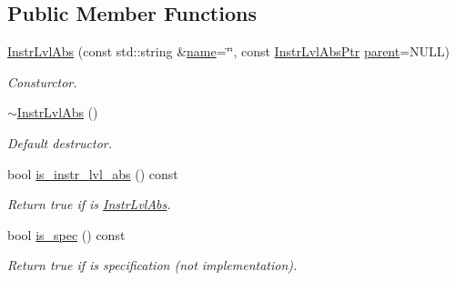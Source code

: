 \subsection*{Public Member Functions}
\begin{DoxyCompactItemize}
\item 
\mbox{\label{classilang_1_1_instr_lvl_abs_aac125331f365cf6e347269051e328100}} 
\mbox{\hyperlink{classilang_1_1_instr_lvl_abs_aac125331f365cf6e347269051e328100}{Instr\+Lvl\+Abs}} (const std\+::string \&\mbox{\hyperlink{classilang_1_1_object_acf20b072e69f572910d7d80c93af0b38}{name}}=\char`\"{}\char`\"{}, const \mbox{\hyperlink{classilang_1_1_instr_lvl_abs_a743fd98e5ad145d70cb0dabf8db0007c}{Instr\+Lvl\+Abs\+Ptr}} \mbox{\hyperlink{classilang_1_1_instr_lvl_abs_ab529f7a931940d7f870cc83fd214822f}{parent}}=N\+U\+LL)
\begin{DoxyCompactList}\small\item\em Consturctor. \end{DoxyCompactList}\item 
\mbox{\label{classilang_1_1_instr_lvl_abs_a9e740acc6e2c56ea7b0fe09fc74b5107}} 
\mbox{\hyperlink{classilang_1_1_instr_lvl_abs_a9e740acc6e2c56ea7b0fe09fc74b5107}{$\sim$\+Instr\+Lvl\+Abs}} ()
\begin{DoxyCompactList}\small\item\em Default destructor. \end{DoxyCompactList}\item 
\mbox{\label{classilang_1_1_instr_lvl_abs_afc9eae178b638c21f36162408f9d0553}} 
bool \mbox{\hyperlink{classilang_1_1_instr_lvl_abs_afc9eae178b638c21f36162408f9d0553}{is\+\_\+instr\+\_\+lvl\+\_\+abs}} () const
\begin{DoxyCompactList}\small\item\em Return true if is \mbox{\hyperlink{classilang_1_1_instr_lvl_abs}{Instr\+Lvl\+Abs}}. \end{DoxyCompactList}\item 
\mbox{\label{classilang_1_1_instr_lvl_abs_a161ba36d2de9caf7ea57d41d7fbddff6}} 
bool \mbox{\hyperlink{classilang_1_1_instr_lvl_abs_a161ba36d2de9caf7ea57d41d7fbddff6}{is\+\_\+spec}} () const
\begin{DoxyCompactList}\small\item\em Return true if is specification (not implementation). \end{DoxyCompactList}\item 

\end{DoxyCompactItemize}
